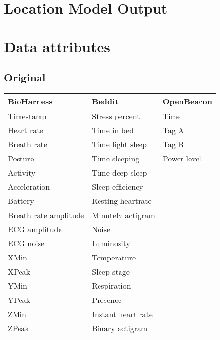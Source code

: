 \lstset{
	numberstyle=\tiny,
	frame=tb,
	basicstyle=\small,
	tabsize=1,
}

\begin{appendices}
	\section{Location Model Output}
		

	\section{Data attributes}
		\subsection{Original}
			\begin{tabular}{lll}
				BioHarness & Beddit & OpenBeacon \\ \hline
				Timestamp & Stress percent & Time\\ 
				Heart rate & Time in bed & Tag A\\
				Breath rate & Time light sleep & Tag B\\
				Posture & Time sleeping & Power level\\
				Activity & Time deep sleep\\
				Acceleration & Sleep efficiency\\
				Battery & Resting heartrate\\
				Breath rate amplitude & Minutely actigram\\
				ECG amplitude & Noise\\
				ECG noise & Luminosity\\
				XMin & Temperature\\
				XPeak & Sleep stage\\
				YMin & Respiration\\
				YPeak & Presence\\
				ZMin & Instant heart rate\\
				ZPeak & Binary actigram\\
			\end{tabular}

\end{appendices}
